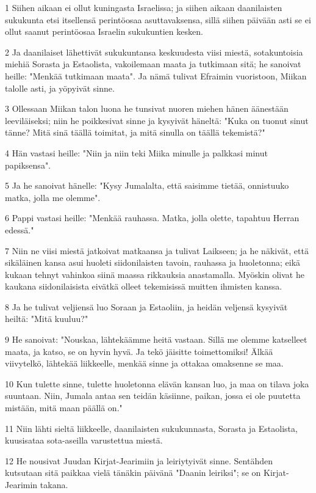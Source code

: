 \par 1 Siihen aikaan ei ollut kuningasta Israelissa; ja siihen aikaan daanilaisten sukukunta etsi itsellensä perintöosaa asuttavaksensa, sillä siihen päivään asti se ei ollut saanut perintöosaa Israelin sukukuntien kesken.
\par 2 Ja daanilaiset lähettivät sukukuntansa keskuudesta viisi miestä, sotakuntoisia miehiä Sorasta ja Estaolista, vakoilemaan maata ja tutkimaan sitä; he sanoivat heille: "Menkää tutkimaan maata". Ja nämä tulivat Efraimin vuoristoon, Miikan talolle asti, ja yöpyivät sinne.
\par 3 Ollessaan Miikan talon luona he tunsivat nuoren miehen hänen äänestään leeviläiseksi; niin he poikkesivat sinne ja kysyivät häneltä: "Kuka on tuonut sinut tänne? Mitä sinä täällä toimitat, ja mitä sinulla on täällä tekemistä?"
\par 4 Hän vastasi heille: "Niin ja niin teki Miika minulle ja palkkasi minut papiksensa".
\par 5 Ja he sanoivat hänelle: "Kysy Jumalalta, että saisimme tietää, onnistuuko matka, jolla me olemme".
\par 6 Pappi vastasi heille: "Menkää rauhassa. Matka, jolla olette, tapahtuu Herran edessä."
\par 7 Niin ne viisi miestä jatkoivat matkaansa ja tulivat Laikseen; ja he näkivät, että sikäläinen kansa asui huoleti siidonilaisten tavoin, rauhassa ja huoletonna; eikä kukaan tehnyt vahinkoa siinä maassa rikkauksia anastamalla. Myöskin olivat he kaukana siidonilaisista eivätkä olleet tekemisissä muitten ihmisten kanssa.
\par 8 Ja he tulivat veljiensä luo Soraan ja Estaoliin, ja heidän veljensä kysyivät heiltä: "Mitä kuuluu?"
\par 9 He sanoivat: "Nouskaa, lähtekäämme heitä vastaan. Sillä me olemme katselleet maata, ja katso, se on hyvin hyvä. Ja tekö jäisitte toimettomiksi! Älkää viivytelkö, lähtekää liikkeelle, menkää sinne ja ottakaa omaksenne se maa.
\par 10 Kun tulette sinne, tulette huoletonna elävän kansan luo, ja maa on tilava joka suuntaan. Niin, Jumala antaa sen teidän käsiinne, paikan, jossa ei ole puutetta mistään, mitä maan päällä on."
\par 11 Niin lähti sieltä liikkeelle, daanilaisten sukukunnasta, Sorasta ja Estaolista, kuusisataa sota-aseilla varustettua miestä.
\par 12 He nousivat Juudan Kirjat-Jearimiin ja leiriytyivät sinne. Sentähden kutsutaan sitä paikkaa vielä tänäkin päivänä "Daanin leiriksi"; se on Kirjat-Jearimin takana.
